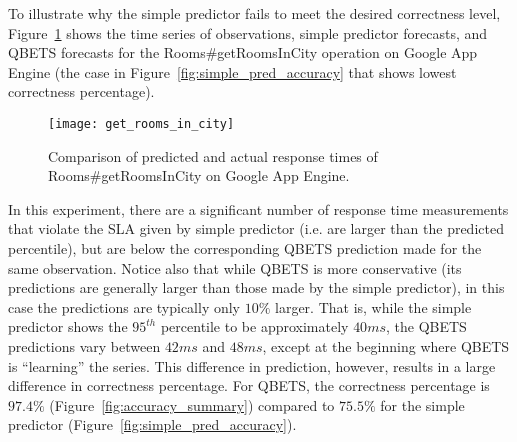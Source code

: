 To illustrate why the simple predictor fails to meet the desired correctness 
level, Figure~\ref{fig:get_rooms_in_city} shows the time series of observations, simple predictor forecasts,
and QBETS forecasts for the 
Rooms\#getRoomsInCity operation on Google App
Engine (the case in Figure~\ref{fig:simple_pred_accuracy} that shows 
lowest correctness percentage).
\begin{figure}
\centering
\texttt{[image: get\_rooms\_in\_city]}
\caption{Comparison of predicted and actual response times of Rooms\#getRoomsInCity on Google App Engine.}
\label{fig:get_rooms_in_city}
\end{figure}

In this experiment, there are a significant number of response
time measurements that violate the SLA given by simple predictor (i.e. are
larger than the predicted percentile), but are below the corresponding QBETS
prediction made for the same observation.
Notice also that while QBETS is more conservative (its predictions are
generally larger than those made by the simple predictor), in this case the
predictions are typically only $10\%$ larger.  That is, while the 
simple predictor shows the $95^{th}$ percentile to be approximately $40ms$,
the QBETS predictions vary between $42ms$ and $48ms$, except at the beginning
where QBETS is ``learning'' the series. This difference in prediction,
however, results in a large difference in correctness percentage.  For QBETS,
the correctness percentage is $97.4\%$ (Figure~\ref{fig:accuracy_summary}) compared to
$75.5\%$ for the simple predictor (Figure~\ref{fig:simple_pred_accuracy}).


